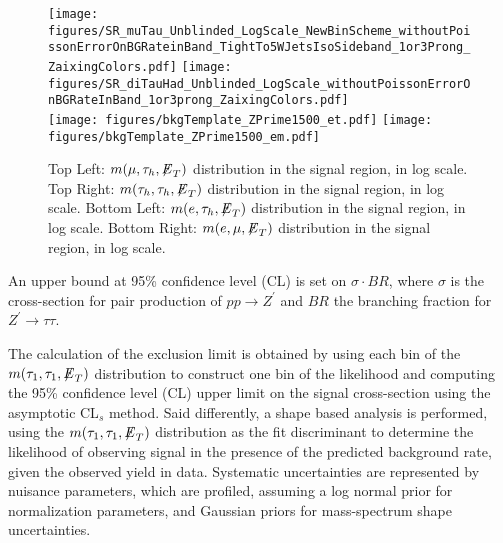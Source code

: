 \begin{figure}[tbh!]
  \centering
   \texttt{[image: figures/SR\_muTau\_Unblinded\_LogScale\_NewBinScheme\_withoutPoissonErrorOnBGRateinBand\_TightTo5WJetsIsoSideband\_1or3Prong\_ZaixingColors.pdf]}
   \texttt{[image: figures/SR\_diTauHad\_Unblinded\_LogScale\_withoutPoissonErrorOnBGRateInBand\_1or3prong\_ZaixingColors.pdf]} \\
   \texttt{[image: figures/bkgTemplate\_ZPrime1500\_et.pdf]}
   \texttt{[image: figures/bkgTemplate\_ZPrime1500\_em.pdf]}
  \caption{ Top Left: $m(\mu,\tau_{h},{\not\mathrel{E}}_T)$ distribution in the signal region, in log scale.  Top Right: $m(\tau_{h},\tau_{h},{\not\mathrel{E}}_T)$ distribution in 
the signal region, in log scale.  Bottom Left: $m(e,\tau_{h},{\not\mathrel{E}}_T)$ distribution in the signal region, in log scale.  Bottom Right: $m(e,\mu,{\not\mathrel{E}}_T)$ 
distribution in the signal region, in log scale.}
    \label{fig:SignalRegionPlot_a}
\end{figure}


An upper bound at 95\% confidence level (CL) is set on $\sigma \cdot BR$, 
where $\sigma$ is the cross-section for pair production of $pp\to Z^{\prime}$ and $BR$ the branching fraction for $Z^{\prime}\to\tau\tau$.

The calculation of the exclusion limit is obtained by using each bin of the $m(\tau_{1},\tau_{1},{\not\mathrel{E}}_T)$ distribution to construct one bin of the likelihood 
and computing the 95\% confidence level (CL) upper limit on the signal cross-section using the asymptotic CL$_{s}$ method. 
Said differently, a shape based analysis is performed, using the $m(\tau_{1},\tau_{1},{\not\mathrel{E}}_T)$ distribution as the fit discriminant to determine the 
likelihood of observing signal in the presence of the predicted background rate, given the observed yield in data. Systematic uncertainties are represented by nuisance parameters, which are profiled, assuming a log normal prior for normalization parameters, and Gaussian priors for mass-spectrum shape uncertainties.

